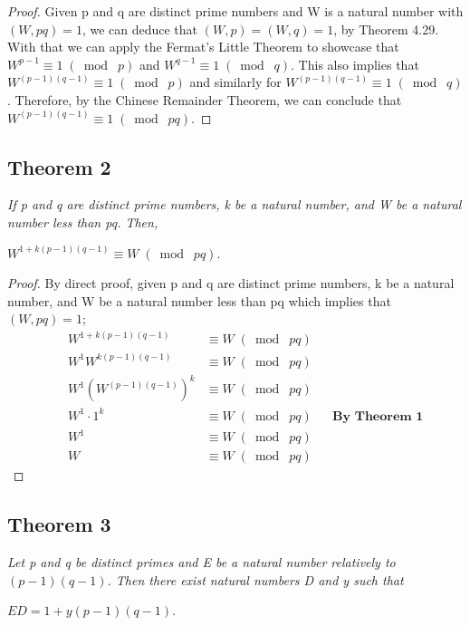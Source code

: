 \documentclass{article}
\begin{document}
\begin{proof}
Given p and q are distinct prime numbers and W is a natural number with $(W, pq) = 1$, we can deduce that $(W, p) = (W, q) = 1$, by Theorem 4.29. With that we can apply the Fermat's Little Theorem to showcase that $W^{p-1} \equiv 1 \;(\bmod\; p)$ and $W^{q-1} \equiv 1 \;(\bmod\; q)$. This also implies that $W^{(p-1)(q-1)} \equiv 1 \;(\bmod\; p)$ and similarly for $W^{(p-1)(q-1)} \equiv 1 \;(\bmod\; q)$. Therefore, by the Chinese Remainder Theorem, we can conclude that $W^{(p-1)(q-1)} \equiv 1 \;(\bmod\; pq)$. 
\end{proof}

\subsection{Theorem 2} \label{4.2}
\quad \textit{If p and q are distinct prime numbers, k be a natural number, and W be a natural number less than pq. Then,}
\begin{center}
    $W^{1+k(p-1)(q-1)} \equiv W \;(\bmod\; pq)$.
\end{center}

\begin{proof}
By direct proof, given p and q are distinct prime numbers, k be a natural number, and W be a natural number less than pq which implies that $(W, pq) = 1$;
\begin{align*}
    &&W^{1+k(p-1)(q-1)} &\equiv W \;(\bmod\; pq) &&\\
    &&W^1W^{k(p-1)(q-1)} &\equiv W \;(\bmod\; pq) &&\\
    &&W^1(W^{(p-1)(q-1)})^{k} &\equiv W \;(\bmod\; pq) &&\\
    &&W^1\cdot1^{k} &\equiv W \;(\bmod\; pq) && \textbf{By Theorem 1}\\
    &&W^1 &\equiv W \;(\bmod\; pq) &&\\
    &&W &\equiv W \;(\bmod\; pq) &&
\end{align*}
\end{proof}

\subsection{Theorem 3} \label{4.3}
\quad \textit{Let p and q be distinct primes and E be a natural number relatively to $(p-1)(q-1)$. Then there exist natural numbers D and y such that}
\begin{center}
    $ED = 1 + y(p-1)(q-1)$.
\end{center}
\end{document}

